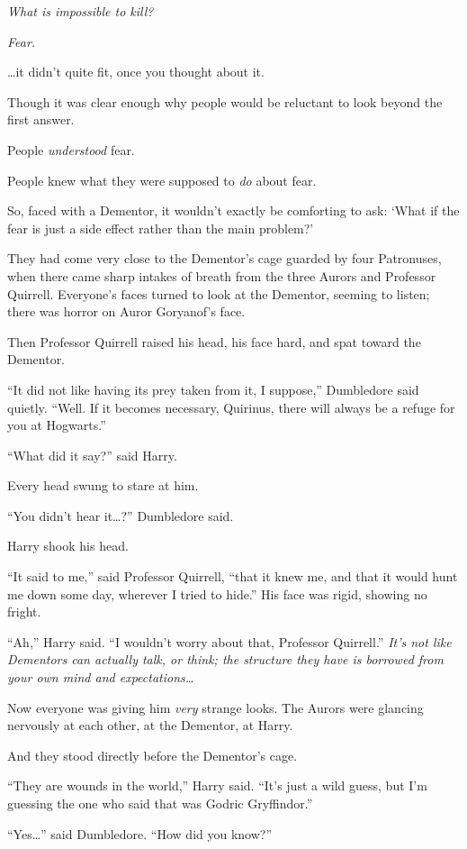 \emph{What is impossible to kill?}

\emph{Fear.}

…it didn’t quite fit, once you thought about it.

Though it was clear enough why people would be reluctant to look beyond the first answer.

People \emph{understood} fear.

People knew what they were supposed to \emph{do} about fear.

So, faced with a Dementor, it wouldn’t exactly be comforting to ask: ‘What if the fear is just a side effect rather than the main problem?’

They had come very close to the Dementor’s cage guarded by four Patronuses, when there came sharp intakes of breath from the three Aurors and Professor Quirrell. Everyone’s faces turned to look at the Dementor, seeming to listen; there was horror on Auror Goryanof’s face.

Then Professor Quirrell raised his head, his face hard, and spat toward the Dementor.

“It did not like having its prey taken from it, I suppose,” Dumbledore said quietly. “Well. If it becomes necessary, Quirinus, there will always be a refuge for you at Hogwarts.”

“What did it say?” said Harry.

Every head swung to stare at him.

“You didn’t hear it…?” Dumbledore said.

Harry shook his head.

“It said to me,” said Professor Quirrell, “that it knew me, and that it would hunt me down some day, wherever I tried to hide.” His face was rigid, showing no fright.

“Ah,” Harry said. “I wouldn’t worry about that, Professor Quirrell.” \emph{It’s not like Dementors can actually talk, or think; the structure they have is borrowed from your own mind and expectations…}

Now everyone was giving him \emph{very} strange looks. The Aurors were glancing nervously at each other, at the Dementor, at Harry.

And they stood directly before the Dementor’s cage.

“They are wounds in the world,” Harry said. “It’s just a wild guess, but I’m guessing the one who said that was Godric Gryffindor.”

“Yes…” said Dumbledore. “How did you know?”

